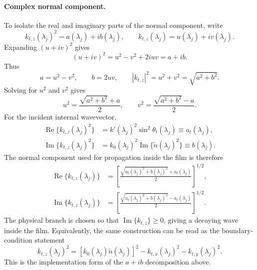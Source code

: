 \documentclass[11pt]{article}
\begin{document}
\paragraph{Complex normal component.}
To isolate the real and imaginary parts of the normal component, write
\begin{equation}
  k_{t,z}(\lambda_j)^2=a(\lambda_j)+i b(\lambda_j),
  \qquad
  k_{t,z}(\lambda_j)=u(\lambda_j)+i v(\lambda_j).
  \label{eq:si_ktz_ab_lambda}
\end{equation}
Expanding $(u+i v)^2$ gives
\begin{equation}
  (u+i v)^2=u^2-v^2+2iuv=a+i b.
\end{equation}
Thus
\begin{equation}
  a=u^2-v^2,
  \qquad
  b=2uv,
  \qquad
  |k_{t,z}|^2=u^2+v^2=\sqrt{a^2+b^2}.
\end{equation}
Solving for $u^2$ and $v^2$ gives
\begin{equation}
  u^2=\frac{\sqrt{a^2+b^2}+a}{2},
  \qquad
  v^2=\frac{\sqrt{a^2+b^2}-a}{2}.
  \label{eq:si_uv_solution_lambda}
\end{equation}
For the incident internal wavevector,
\begin{align}
  \operatorname{Re}\{k_{t,z}(\lambda_j)^2\}
  &= k'(\lambda_j)^2\sin^2\theta_t(\lambda_j)
  \equiv a_t(\lambda_j),\\
  \operatorname{Im}\{k_{t,z}(\lambda_j)^2\}
  &= k_0(\lambda_j)^2\operatorname{Im}\{\tilde{n}(\lambda_j)^2\}
  \equiv b(\lambda_j).
  \label{eq:si_at_b_lambda}
\end{align}
The normal component used for propagation inside the film is therefore
\begin{align}
  \operatorname{Re}\{k_{t,z}(\lambda_j)\}
  &=
  \left[
  \frac{\sqrt{a_t(\lambda_j)^2+b(\lambda_j)^2}+a_t(\lambda_j)}{2}
  \right]^{1/2},\\
  \operatorname{Im}\{k_{t,z}(\lambda_j)\}
  &=
  \left[
  \frac{\sqrt{a_t(\lambda_j)^2+b(\lambda_j)^2}-a_t(\lambda_j)}{2}
  \right]^{1/2}.
  \label{eq:si_ktz_solution_lambda}
\end{align}
The physical branch is chosen so that $\operatorname{Im}\{k_{t,z}\}\ge 0$, giving a decaying wave
inside the film. Equivalently, the same construction can be read as the boundary-condition statement
\begin{equation}
  k_{t,z}(\lambda_j)^2
  =
  \left[k_0(\lambda_j)\tilde{n}(\lambda_j)\right]^2
  -k_{t,x}(\lambda_j)^2-k_{t,y}(\lambda_j)^2.
  \label{eq:si_boundary_ktz_lambda}
\end{equation}
This is the implementation form of the $a+i b$ decomposition above.
\end{document}
